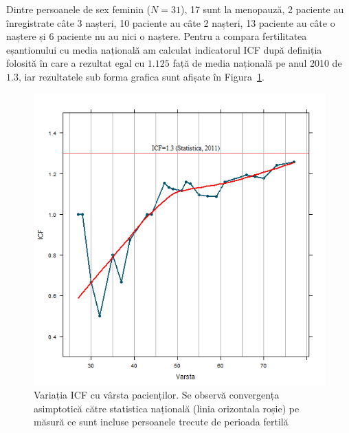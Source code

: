 \documentclass[12pt]{article}
\begin{document}
  Dintre persoanele de sex feminin ($N=31$), 17 sunt la menopauză, 2 paciente au înregistrate câte 3 nașteri, 10 paciente au câte 2 nașteri, 13 paciente au câte o naștere și 6 paciente nu au nici o naștere. Pentru a compara fertilitatea eșantionului cu media națională am calculat indicatorul \ac{ICF} după definiția folosită în \citep{insee2011} care a rezultat egal cu $1.125$ față de media națională pe anul 2010 de $1.3$, iar rezultatele sub forma grafica sunt afișate în Figura~\ref{fig:incoNasteriICF}.
  \begin{figure}[H]
    \centering
    \includegraphics[width=0.8\linewidth]{incoNasteriICF}
    \caption{Variația ICF cu vârsta pacienților. Se observă convergența asimptotică către statistica națională (linia orizontala roșie) pe măsură ce sunt incluse persoanele trecute de perioada fertilă }
    \label{fig:incoNasteriICF}
  \end{figure}
  
\end{document}
